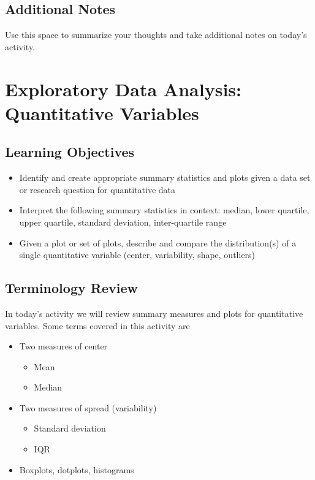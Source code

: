 \documentclass[
]{report}
\providecommand{\tightlist}{%
  \setlength{\itemsep}{0pt}\setlength{\parskip}{0pt}}
\begin{document}
\hypertarget{additional-notes-2}{%
\section{Additional Notes}\label{additional-notes-2}}

Use this space to summarize your thoughts and take additional notes on today's activity.

\hypertarget{exploratory-data-analysis-quantitative-variables}{%
\chapter{Exploratory Data Analysis: Quantitative Variables}\label{exploratory-data-analysis-quantitative-variables}}

\hypertarget{learning-objectives}{%
\section{Learning Objectives}\label{learning-objectives}}

\begin{itemize}
\item
  Identify and create appropriate summary statistics and plots
  given a data set or research question for quantitative data
\item
  Interpret the following summary statistics in context:
  median, lower quartile, upper quartile,
  standard deviation, inter-quartile range
\item
  Given a plot or set of plots, describe and compare the distribution(s)
  of a single quantitative variable
  (center, variability, shape, outliers)
\end{itemize}

\hypertarget{terminology-review-2}{%
\section{Terminology Review}\label{terminology-review-2}}

In today's activity we will review summary measures and plots for quantitative variables. Some terms covered in this activity are

\begin{itemize}
\tightlist
\item
  Two measures of center

  \begin{itemize}
  \tightlist
  \item
    Mean
  \item
    Median
  \end{itemize}
\item
  Two measures of spread (variability)

  \begin{itemize}
  \tightlist
  \item
    Standard deviation
  \item
    IQR
  \end{itemize}
\item
  Boxplots, dotplots, histograms
\end{itemize}
\end{document}
